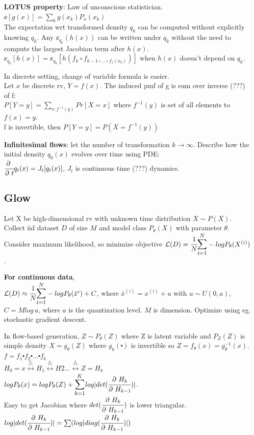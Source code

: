\documentclass[12pt,a4paper]{article}
\begin{document}
\vspace{0.5cm}
\textbf{LOTUS property}: Law of unconscious statistician.\\
$\ee[g(x)]=\sum_k g(x_k)P_x(x_k)$\\
The expectation wrt transformed density $q_k$ can be computed without explicitly knowing $q_k$. Any $\ee_{q_k}(h(x))$ can be written under $q_k$ without the need to compute the largest Jacobian term after $h(x)$.\\ 
$\ee_{q_k}[h(x)]=\ee_{q_0}[h(f_k\circ f_{k-1\circ ... \circ f_1(x_0)})]$ when $h(x)$ doesn't depend on $q_k$.

\vspace{0.5cm}
In discrete setting, change of variable formula is easier. \\
Let $x$ be discrete rv, $Y=f(x)$. The induced pmf of g is sum over inverse (???) of f:\\
$P[Y=y]=\sum_{x: f^{-1}(y)}Pr[X=x]$ where $f^{-1}(y)$ is set of all elements to $f(x)=y$. \\
f is invertible, then $P[Y=y]=P(X=f^{-1}(y))$

\vspace{0.5cm}
\textbf{Infinitesimal flows}: let the number of transformation $k\rightarrow \infty$. Describe how the initial density $q_0(x)$ evolves over time using PDE:\\
$\cfrac{\partial\ }{\partial\ t}q_t(x)=J_t[q_t(x)]$, $J_t$ is continuous time (???) dynamics. 

\vspace{0.5cm}
\subsection{Glow}
Let X be high-dimensional rv with unknown time distribution $X\sim P(X)$. Collect iid dataset $D$ of size $M$ and model class $P_\theta(X)$ with parameter $\theta$. 
Consider maximum likelihood, so minimize objective $\lossl(D)=\cfrac{1}{N}\bsum{i=1}{N}-logP_\theta(X^{(i)})$.

\textbf{For continuous data},\\ 
$\lossl(D)\approx \cfrac{1}{N}\bsum{i=1}{N}-logP_\theta(\bar{x}^{i})+C$, where $\bar{x}^{(i)}=x^{(i)}+u$ with $u\sim U(0,a)$, $C=Mlog\ a$, where $a$ is the quantization level. $M$ is dimension. Optimize using eg. stochastic gradient descent. 

In flow-based generation, $Z\sim P_\theta(Z)$ where Z is latent variable and $P_Z(Z)$ is simple density $X=g_\theta(Z)$ where $g_k(\centerdot)$ is invertible so $Z=f_\theta(x)=g_\theta^{-1}(x)$. \\
$f=f_1\centerdot f_2 \centerdot ... \centerdot f_k$\\
$H_0=x\overset{f_1}{\longleftrightarrow}H_1\overset{f_2}{\longleftrightarrow}H2...\overset{f_k}{\longleftrightarrow}Z=H_k$\\
$logP_\theta(x)=logP_\theta(Z)+\bsum{k=1}{K}log|det(\pfrac{H_k}{H_{k-1}})|$. \\
Easy to get Jacobian where $det(\cfrac{\partial\ H_k}{\partial\ H_{k-1}})$ is lower triangular. $log|det(\cfrac{\partial\ H_k}{\partial\ H_{k-1}})|=\sum(log|diag(\cfrac{\partial\ H_k}{\partial\ H_{k-1}})|)$
\end{document}
